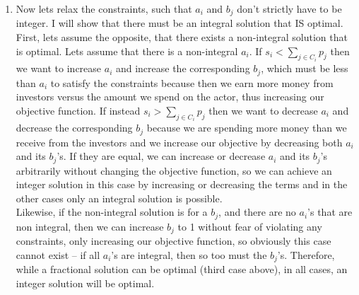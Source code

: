 \documentclass[11pt]{article}
\begin{document}
\begin{enumerate}
\begin{enumerate}
\item Now lets relax the constraints, such that $a_i$ and $b_j$ don't strictly have to be integer. I will show that there must be an integral solution that IS optimal. First, lets assume the opposite, that there exists a non-integral solution that is optimal. Lets assume that there is a non-integral $a_i$. If $s_i<\sum_{j\in C_i}p_j$ then we want to increase $a_i$ and increase the corresponding $b_j$, which must be less than $a_i$ to satisfy the constraints because then we earn more money from investors versus the amount we spend on the actor, thus increasing our objective function. If instead $s_i > \sum_{j\in C_i}p_j$ then we want to decrease $a_i$ and decrease the corresponding $b_j$ because we are spending more money than we receive from the investors and we increase our objective by decreasing both $a_i$ and its $b_j$'s. If they are equal, we can increase or decrease $a_i$ and its $b_j$'s arbitrarily without changing the objective function, so we can achieve an integer solution in this case by increasing or decreasing the terms and in the other cases only an integral solution is possible. \\
Likewise, if the non-integral solution is for a $b_j$, and there are no $a_i$'s that are non integral, then we can increase $b_j$ to 1 without fear of violating any constraints, only increasing our objective function, so obviously this case cannot exist -- if all $a_i$'s are integral, then so too must the $b_j$'s. Therefore, while a fractional solution can be optimal (third case above), in all cases, an integer solution will be optimal.
\end{enumerate}


\end{enumerate}
\end{document}

